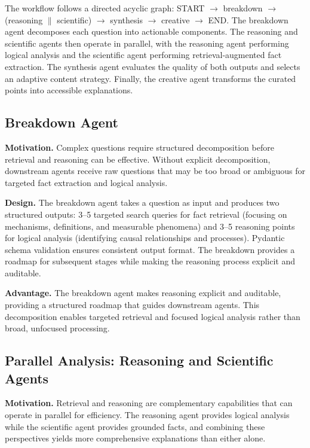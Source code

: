 The workflow follows a directed acyclic graph: START $\rightarrow$ breakdown $\rightarrow$ (reasoning $\parallel$ scientific) $\rightarrow$ synthesis $\rightarrow$ creative $\rightarrow$ END. The breakdown agent decomposes each question into actionable components. The reasoning and scientific agents then operate in parallel, with the reasoning agent performing logical analysis and the scientific agent performing retrieval-augmented fact extraction. The synthesis agent evaluates the quality of both outputs and selects an adaptive content strategy. Finally, the creative agent transforms the curated points into accessible explanations.



\subsection{Breakdown Agent}

\textbf{Motivation.} Complex questions require structured decomposition before retrieval and reasoning can be effective. Without explicit decomposition, downstream agents receive raw questions that may be too broad or ambiguous for targeted fact extraction and logical analysis.

\textbf{Design.} The breakdown agent takes a question as input and produces two structured outputs: 3--5 targeted search queries for fact retrieval (focusing on mechanisms, definitions, and measurable phenomena) and 3--5 reasoning points for logical analysis (identifying causal relationships and processes). Pydantic schema validation ensures consistent output format. The breakdown provides a roadmap for subsequent stages while making the reasoning process explicit and auditable.

\textbf{Advantage.} The breakdown agent makes reasoning explicit and auditable, providing a structured roadmap that guides downstream agents. This decomposition enables targeted retrieval and focused logical analysis rather than broad, unfocused processing.

\subsection{Parallel Analysis: Reasoning and Scientific Agents}

\textbf{Motivation.} Retrieval and reasoning are complementary capabilities that can operate in parallel for efficiency. The reasoning agent provides logical analysis while the scientific agent provides grounded facts, and combining these perspectives yields more comprehensive explanations than either alone.

